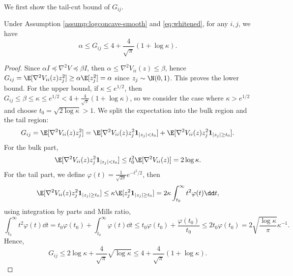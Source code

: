 We first show the tail-cut bound of $G_{ij}$.

\begin{lemma}\label{lem:tailcut}
    Under Assumption \ref{assump:logconcave-smooth} and \eqref{eq:whitened}, for any $i, j$, we have
    \begin{equation*}
        \alpha \leq G_{ij} \leq 4 + \frac{4}{\sqrt{\pi}} ( 1 + \log \kappa).
    \end{equation*}
\end{lemma}

\begin{proof}
    Since $\alpha I \preceq \nabla^2 V \preceq \beta I$, then $\alpha \leq \nabla^2 V_{ii} (z) \leq \beta$, hence $G_{ij} = \E[\nabla^2 V_{ii} (z) z_j^2] \geq \alpha \E[z_j^2] = \alpha$ since $z_j \sim \N (0, 1)$. This proves the lower bound. For the upper bound, if $\kappa \leq e^{1/2}$, then $G_{ij} \leq \beta \leq \kappa \leq e^{1/2} < 4 + \frac{4}{\sqrt{\pi}} ( 1 + \log \kappa)$, so we consider the case where $\kappa > e^{1/2}$ and choose $t_0 = \sqrt{2 \log \kappa}> 1$. We split the expectation into the bulk region and the tail region:
    \begin{equation*}
        G_{ij} = \E[\nabla^2 V_{ii} (z) z_j^2] = \E[\nabla^2 V_{ii} (z) z_j^2 \mathbf{1}_{|z_j| < t_0}] + \E[\nabla^2 V_{ii} (z) z_j^2 \mathbf{1}_{|z_j| \geq t_0}].
    \end{equation*}
    For the bulk part,
    \begin{equation*}
        \E[\nabla^2 V_{ii} (z) z_j^2 \mathbf{1}_{|z_j| < t_0}] \leq t_0^2 \E[\nabla^2 V_{ii} (z)] = 2 \log \kappa.
    \end{equation*}
    For the tail part, we define $\varphi (t) = \frac{1}{\sqrt{2\pi}} e^{-t^2 / 2}$, then
    \begin{equation*}
        \E[\nabla^2 V_{ii} (z) z_j^2 \mathbf{1}_{|z_j| \geq t_0}] \leq \kappa \E[z_j^2 \mathbf{1}_{|z_j| \geq t_0}] = 2 \kappa \int_{t_0}^\infty t^2 \varphi(t) \dd t,
    \end{equation*}
    using integration by parts and Mills ratio,
    \begin{equation*}
        \int_{t_0}^\infty t^2 \varphi(t) \dd t = t_0 \varphi (t_0) + \int_{t_0}^\infty \varphi(t) \dd t \leq t_0 \varphi (t_0) + \frac{\varphi (t_0)}{t_0} \leq 2t_0 \varphi(t_0) = 2\sqrt{\frac{\log \kappa}{\pi}} \kappa^{-1}.
    \end{equation*}
    Hence,
    \begin{equation*}
        G_{ij} \leq 2 \log \kappa + \frac{4}{\sqrt{\pi}} \sqrt{\log \kappa} \leq 4 + \frac{4}{\sqrt{\pi}} (1 + \log \kappa).
    \end{equation*}
\end{proof}


